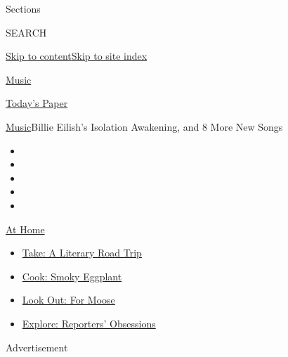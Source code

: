 Sections

SEARCH

\protect\hyperlink{site-content}{Skip to
content}\protect\hyperlink{site-index}{Skip to site index}

\href{https://www.nytimes3xbfgragh.onion/section/arts/music}{Music}

\href{https://myaccount.nytimes3xbfgragh.onion/auth/login?response_type=cookie\&client_id=vi}{}

\href{https://www.nytimes3xbfgragh.onion/section/todayspaper}{Today's
Paper}

\href{/section/arts/music}{Music}\textbar{}Billie Eilish's Isolation
Awakening, and 8 More New Songs

\begin{itemize}
\item
\item
\item
\item
\item
\end{itemize}

\href{https://www.nytimes3xbfgragh.onion/spotlight/at-home?action=click\&pgtype=Article\&state=default\&region=TOP_BANNER\&context=at_home_menu}{At
Home}

\begin{itemize}
\tightlist
\item
  \href{https://www.nytimes3xbfgragh.onion/2020/07/28/books/time-for-a-literary-road-trip.html?action=click\&pgtype=Article\&state=default\&region=TOP_BANNER\&context=at_home_menu}{Take:
  A Literary Road Trip}
\item
  \href{https://www.nytimes3xbfgragh.onion/2020/07/29/magazine/bored-with-your-home-cooking-some-smoky-eggplant-will-fix-that.html?action=click\&pgtype=Article\&state=default\&region=TOP_BANNER\&context=at_home_menu}{Cook:
  Smoky Eggplant}
\item
  \href{https://www.nytimes3xbfgragh.onion/2020/07/27/travel/moose-michigan-isle-royale.html?action=click\&pgtype=Article\&state=default\&region=TOP_BANNER\&context=at_home_menu}{Look
  Out: For Moose}
\item
  \href{https://www.nytimes3xbfgragh.onion/interactive/2020/at-home/even-more-reporters-editors-diaries-lists-recommendations.html?action=click\&pgtype=Article\&state=default\&region=TOP_BANNER\&context=at_home_menu}{Explore:
  Reporters' Obsessions}
\end{itemize}

Advertisement

